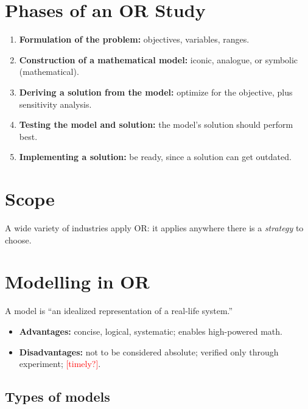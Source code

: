\documentclass[11pt]{article}
\newcommand{\unclear}[1]{\textcolor{red}{[#1?]}}
\begin{document}
\section{Phases of an OR Study}

\begin{enumerate}
    \item \textbf{Formulation of the problem:} objectives, variables, ranges.
    \item \textbf{Construction of a mathematical model:} iconic, analogue, or
          symbolic (mathematical).
    \item \textbf{Deriving a solution from the model:} optimize for the objective,
          plus sensitivity analysis.
    \item \textbf{Testing the model and solution:} the model's solution should
          perform best.
    \item \textbf{Implementing a solution:} be ready, since a solution can get
          outdated.
\end{enumerate}

\section{Scope}

A wide variety of industries apply OR: it applies anywhere there is a
\emph{strategy} to choose.

\section{Modelling in OR}

A model is ``an idealized representation of a real-life system.''

\begin{itemize}
    \item \textbf{Advantages:} concise, logical, systematic; enables high-powered math.
    \item \textbf{Disadvantages:} not to be considered absolute; verified only
          through experiment; \unclear{timely}.
\end{itemize}

\subsection*{Types of models}
\end{document}
